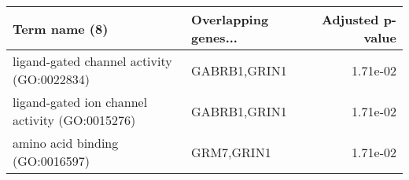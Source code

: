 \begin{tabular}{llr}
\toprule
                                 Term name (8) & Overlapping genes... &  Adjusted p-value \\
\midrule
    ligand-gated channel activity (GO:0022834) &         GABRB1,GRIN1 &          1.71e-02 \\
ligand-gated ion channel activity (GO:0015276) &         GABRB1,GRIN1 &          1.71e-02 \\
               amino acid binding (GO:0016597) &           GRM7,GRIN1 &          1.71e-02 \\
\bottomrule
\end{tabular}
